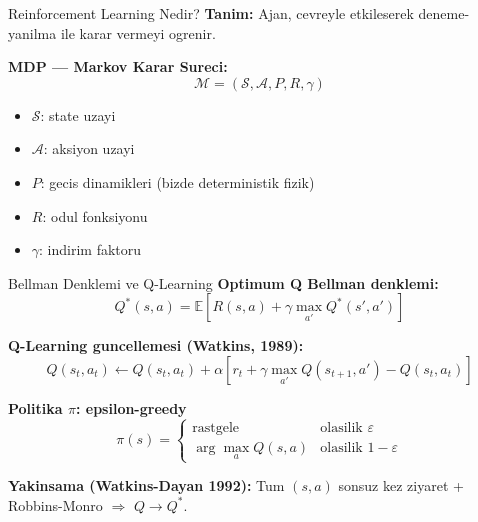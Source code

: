 \documentclass[10pt,aspectratio=169]{beamer}
\begin{document}
\begin{frame}{Reinforcement Learning Nedir?}
\textbf{Tanim:} Ajan, cevreyle etkileserek deneme-yanilma ile karar vermeyi ogrenir.

\vspace{0.5em}
\begin{center}
\end{center}

\vspace{0.3em}
\textbf{MDP --- Markov Karar Sureci:}
\[ \mathcal{M} = (\mathcal{S}, \mathcal{A}, P, R, \gamma) \]

\begin{itemize}\footnotesize
  \item $\mathcal{S}$: state uzayi
  \item $\mathcal{A}$: aksiyon uzayi
  \item $P$: gecis dinamikleri (bizde deterministik fizik)
  \item $R$: odul fonksiyonu
  \item $\gamma$: indirim faktoru
\end{itemize}
\end{frame}

\begin{frame}{Bellman Denklemi ve Q-Learning}
\textbf{Optimum Q Bellman denklemi:}
\[
Q^*(s, a) = \mathbb{E}[R(s,a) + \gamma \max_{a'} Q^*(s', a')]
\]

\textbf{Q-Learning guncellemesi (Watkins, 1989):}
\[
\boxed{\;Q(s_t, a_t) \leftarrow Q(s_t, a_t) + \alpha[r_t + \gamma \max_{a'} Q(s_{t+1}, a') - Q(s_t, a_t)]\;}
\]

\vspace{0.4em}
\textbf{Politika $\pi$: epsilon-greedy}
\[
\pi(s) = \begin{cases}
\text{rastgele} & \text{olasilik } \varepsilon \\
\arg\max_a Q(s, a) & \text{olasilik } 1-\varepsilon
\end{cases}
\]

\textbf{Yakinsama (Watkins-Dayan 1992):} Tum $(s,a)$ sonsuz kez ziyaret + Robbins-Monro $\Rightarrow$ $Q \to Q^*$.
\end{frame}
\end{document}
